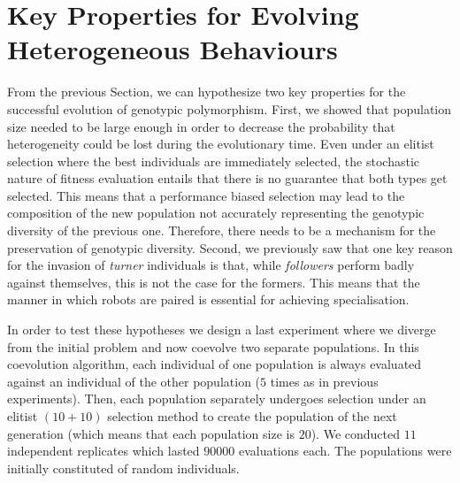 \section{Key Properties for Evolving Heterogeneous Behaviours}
  From the previous Section, we can hypothesize two key properties for the successful evolution of genotypic polymorphism. First, we showed that population size needed to be large enough in order to decrease the probability that heterogeneity could be lost during the evolutionary time. Even under an elitist selection where the best individuals are immediately selected, the stochastic nature of fitness evaluation entails that there is no guarantee that both types get selected. This means that a performance biased selection may lead to the composition of the new population not accurately representing the genotypic diversity of the previous one. Therefore, there needs to be a mechanism for the preservation of genotypic diversity. Second, we previously saw that one key reason for the invasion of \emph{turner} individuals is that, while \emph{followers} perform badly against themselves, this is not the case for the formers. This means that the manner in which robots are paired is essential for achieving specialisation.

  In order to test these hypotheses we design a last experiment where we diverge from the initial problem and now coevolve two separate populations. In this coevolution algorithm, each individual of one population is always evaluated against an individual of the other population ($5$ times as in previous experiments). Then, each population separately undergoes selection under an elitist \((10+10)\) selection method to create the population of the next generation (which means that each population size is $20$). We conducted $11$ independent replicates which lasted $90000$ evaluations each. The populations were initially constituted of random individuals.

  \begin{table}[ht]
    \caption{\textbf{Strategies evolved by the best individuals when coevolving two populations.} Repartition of the different strategies adopted bt the best individuals at the last evaluation in each of the $11$ replicates. We indicate in each cell the number of simulations where a particular strategy evolved. Two populations were coevolved under elitist selection and the individuals' genotype values were initially random. In the table "L/F" stands for leader/follower and "NC" for "Non-Cooperative".}
    \label{tab:coevoStrategies}
  \end{table}

